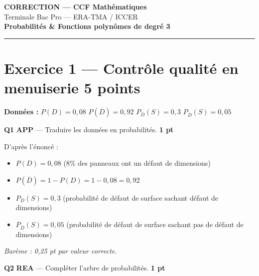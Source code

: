 \documentclass[a4paper,11pt]{article}
\newcommand{\pts}[1]{\hfill\textcolor{gris}{\small\textbf{#1}}}
\newcommand{\comp}[1]{\colorbox{blue!10}{\scriptsize\textbf{#1}}}
\begin{document}
\begin{center}
{\LARGE\bfseries\color{rouge} CORRECTION — CCF Mathématiques}\\[8pt]
{\large Terminale Bac Pro — ERA-TMA / ICCER}\\[8pt]
{\Large\bfseries Probabilités \& Fonctions polynômes de degré 3}\\[12pt]
\textcolor{rouge}{\rule{12cm}{1pt}}
\end{center}

\vspace{10pt}

\section*{Exercice 1 — Contrôle qualité en menuiserie \pts{5 points}}

\begin{contextebox}
\textbf{Données :} $P(D) = 0{,}08$ \quad $P(\overline{D}) = 0{,}92$ \quad $P_D(S) = 0{,}3$ \quad $P_{\overline{D}}(S) = 0{,}05$
\end{contextebox}

\vspace{6pt}

\textbf{Q1} \comp{APP} — Traduire les données en probabilités. \pts{1 pt}

\begin{corrbox}
D'après l'énoncé :
\begin{itemize}[nosep]
  \item $P(D) = 0{,}08$ \quad (8\% des panneaux ont un défaut de dimensions)
  \item $P(\overline{D}) = 1 - P(D) = 1 - 0{,}08 = \boxed{0{,}92}$
  \item $P_D(S) = 0{,}3$ \quad (probabilité de défaut de surface sachant défaut de dimensions)
  \item $P_{\overline{D}}(S) = 0{,}05$ \quad (probabilité de défaut de surface sachant pas de défaut de dimensions)
\end{itemize}

\textit{Barème : 0,25 pt par valeur correcte.}
\end{corrbox}

\textbf{Q2} \comp{REA} — Compléter l'arbre de probabilités. \pts{1 pt}
\end{document}
